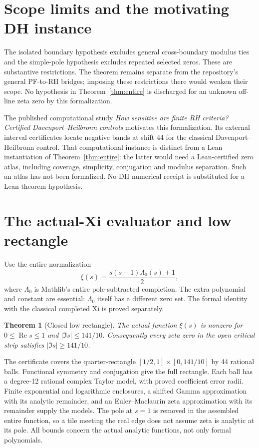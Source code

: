 \documentclass[11pt]{amsart}
\newtheorem{theorem}{Theorem}[section]
\newcommand{\Repart}{\operatorname{Re}}
\begin{document}
\section{Scope limits and the motivating DH instance}
The isolated boundary hypothesis excludes general cross-boundary modulus ties and the simple-pole hypothesis excludes repeated selected zeros. These are substantive restrictions. The theorem remains separate from the repository's general PF-to-RH bridges; imposing these restrictions there would weaken their scope. No hypothesis in Theorem~\ref{thm:entire} is discharged for an unknown off-line zeta zero by this formalization.

The published computational study \emph{How sensitive are finite RH criteria? Certified Davenport--Heilbronn controls} \cite{dhcontrols} motivates this formalization. Its external interval certificates locate negative bands at shift 44 for the classical Davenport--Heilbronn control. That computational instance is distinct from a Lean instantiation of Theorem~\ref{thm:entire}: the latter would need a Lean-certified zero atlas, including coverage, simplicity, conjugation and modulus separation. Such an atlas has not been formalized. No DH numerical receipt is substituted for a Lean theorem hypothesis.

\section{The actual-Xi evaluator and low rectangle}
Use the entire normalization
\[
 \xi(s)=\frac{s(s-1)\Lambda_0(s)+1}{2},
\]
where $\Lambda_0$ is Mathlib's entire pole-subtracted completion. The extra
polynomial and constant are essential: $\Lambda_0$ itself has a different zero
set. The formal identity with the classical completed Xi is proved separately.

\begin{theorem}[Closed low rectangle]\label{thm:rectangle}
The actual function $\xi(s)$ is nonzero for
$0\le\Repart s\le1$ and $|\Im s|\le141/10$.
Consequently every zeta zero in the open critical strip satisfies
$|\Im s|\ge141/10$.
\end{theorem}

The certificate covers the quarter-rectangle
$[1/2,1]\times[0,141/10]$ by 44 rational balls.
Functional symmetry and conjugation give the full rectangle.
Each ball has a degree-12 rational complex Taylor model, with proved
coefficient error radii. Finite exponential and logarithmic enclosures,
a shifted Gamma approximation with its analytic remainder, and an
Euler--Maclaurin zeta approximation with its remainder supply the models.
The pole at $s=1$ is removed in the assembled entire function, so a tile
meeting the real edge does not assume zeta is analytic at its pole.
All bounds concern the actual analytic functions, not only formal polynomials.
\end{document}
